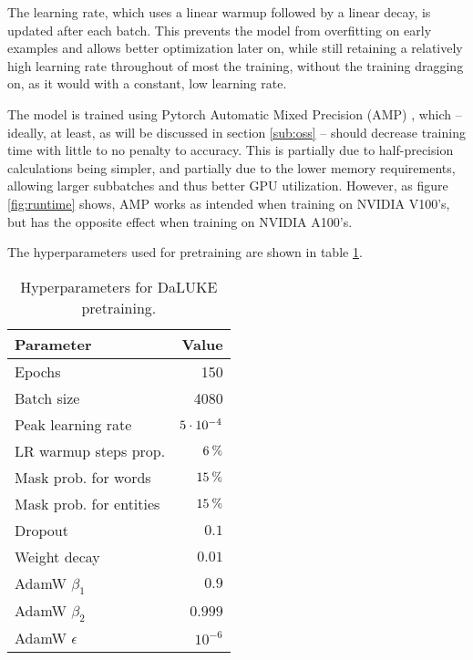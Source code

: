 \documentclass[main.tex]{subfiles}
\begin{document}
The learning rate, which uses a linear warmup followed by a linear decay, is updated after each batch.
This prevents the model from overfitting on early examples and allows better optimization later on, while still retaining a relatively high learning rate throughout of most the training, without the training dragging on, as it would with a constant, low learning rate.

The model is trained using Pytorch Automatic Mixed Precision (AMP) \cite{pytorchamp}, which -- ideally, at least, as will be discussed in section \ref{sub:oss} -- should decrease training time with little to no penalty to accuracy. \cite{huang2020amp}
This is partially due to half-precision calculations being simpler, and partially due to the lower memory requirements, allowing larger subbatches and thus better GPU utilization.
However, as figure \ref{fig:runtime} shows, AMP works as intended when training on NVIDIA V100's, but has the opposite effect when training on NVIDIA A100's.

The hyperparameters used for pretraining are shown in table \ref{tab:pretrain-hyper}.
\begin{table}[H]
    \centering
    \begin{tabular}{l|r}
        Parameter  &    Value\\\hline
        Epochs     & 150\\
        Batch size &    4080\\
        Peak learning rate & $5\cdot10^{-4}$\\
        LR warmup steps prop. & $ 6\:\text{\%{}} $\\
        Mask prob. for words & $ 15\:\text{\%{}} $\\
        Mask prob. for entities & $ 15\:\text{\%{}} $\\
        Dropout & $ 0.1 $\\
        Weight decay & $ 0.01 $\\
        AdamW $ \beta_1 $ & $ 0.9 $\\
        AdamW $ \beta_2 $ & $ 0.999 $\\
        AdamW $ \epsilon $ & $ 10^{-6} $
    \end{tabular}
    \caption{Hyperparameters for DaLUKE pretraining.}\label{tab:pretrain-hyper}
\end{table}\noindent
\end{document}
